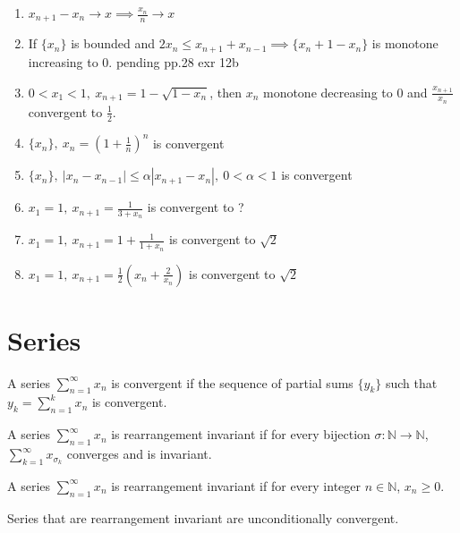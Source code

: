 	\begin{remark}
		\begin{enumerate}
			\item $x_{n+1}-x_n \to x \implies \frac{x_n}{n} \to x$
			\item If $\{ x_n \}$ is bounded and $2x_n \le x_{n+1}+x_{n-1} \implies \{ x_n+1 - x_n \}$ is monotone increasing to 0. pending pp.28 exr 12b\cite{alip2}
			\item $ 0 < x_1 < 1,\ x_{n+1} = 1-\sqrt{1-x_n}$, then $x_n$ monotone decreasing to 0 and $\frac{x_{n+1}}{x_n}$ convergent to $\frac{1}{2}$.
			\item $\{ x_n \},\ x_n = \left( 1 + \frac{1}{n} \right)^n$ is convergent
			\item $\{ x_n \},\ |x_n-x_{n-1}| \le \alpha |x_{n+1}-x_n|,\ 0 < \alpha < 1$ is convergent
			\item $x_1 = 1,\ x_{n+1} = \frac{1}{3+x_n}$ is convergent to ?
			\item $x_1 = 1,\ x_{n+1} = 1+ \frac{1}{1+x_n}$ is convergent to $\sqrt{2}$
			\item $x_1 = 1,\ x_{n+1} = \frac{1}{2} \left( x_n + \frac{2}{x_n} \right)$ is convergent to $\sqrt{2}$
		\end{enumerate}
	\end{remark}

\section{Series}
	\begin{definition}
		A series $\sum_{n=1}^\infty x_n$ is convergent if the sequence of partial sums $\{y_k\}$ such that $y_k = \sum_{n=1}^k x_n$ is convergent.
	\end{definition}
	\begin{definition}
		A series $\sum_{n=1}^\infty x_n$ is rearrangement invariant if for every bijection $\sigma : \mathbb{N} \to \mathbb{N}$, $\sum_{k=1}^\infty x_{\sigma_k}$ converges and is invariant.
	\end{definition}
	\begin{theorem}
		A series $\sum_{n=1}^\infty x_n$ is rearrangement invariant if for every integer $n \in \mathbb{N}$, $x_n \ge 0$.
	\end{theorem}
	\begin{remark}
		Series that are rearrangement invariant are unconditionally convergent.
	\end{remark}

